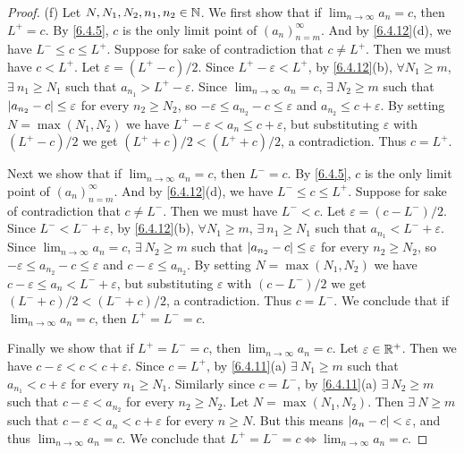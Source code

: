 \begin{proof}{(f)}
  Let \(N, N_1, N_2, n_1, n_2 \in \mathbb{N}\).
  We first show that if \(\lim_{n \to \infty} a_n = c\), then \(L^+ = c\).
  By \cref{6.4.5}, \(c\) is the only limit point of \((a_n)_{n = m}^\infty\).
  And by \cref{6.4.12}(d), we have \(L^- \leq c \leq L^+\).
  Suppose for sake of contradiction that \(c \neq L^+\).
  Then we must have \(c < L^+\).
  Let \(\varepsilon = (L^+ - c) / 2\).
  Since \(L^+ - \varepsilon < L^+\), by \cref{6.4.12}(b), \(\forall N_1 \geq m\), \(\exists\ n_1 \geq N_1\) such that \(a_{n_1} > L^+ - \varepsilon\).
  Since \(\lim_{n \to \infty} a_n = c\), \(\exists\ N_2 \geq m\) such that \(\left\lvert a_{n_2} - c\right\rvert \leq \varepsilon\) for every \(n_2 \geq N_2\), so \(-\varepsilon \leq a_{n_2} - c \leq \varepsilon\) and \(a_{n_2} \leq c + \varepsilon\).
  By setting \(N = \max(N_1, N_2)\) we have \(L^+ - \varepsilon < a_n \leq c + \varepsilon\), but substituting \(\varepsilon\) with \((L^+ - c) / 2\) we get \((L^+ + c) / 2 < (L^+ + c) / 2\), a contradiction.
  Thus \(c = L^+\).

  Next we show that if \(\lim_{n \to \infty} a_n = c\), then \(L^- = c\).
  By \cref{6.4.5}, \(c\) is the only limit point of \((a_n)_{n = m}^\infty\).
  And by \cref{6.4.12}(d), we have \(L^- \leq c \leq L^+\).
  Suppose for sake of contradiction that \(c \neq L^-\).
  Then we must have \(L^- < c\).
  Let \(\varepsilon = (c - L^-) / 2\).
  Since \(L^- < L^- + \varepsilon\), by \cref{6.4.12}(b), \(\forall N_1 \geq m\), \(\exists\ n_1 \geq N_1\) such that \(a_{n_1} < L^- + \varepsilon\).
  Since \(\lim_{n \to \infty} a_n = c\), \(\exists\ N_2 \geq m\) such that \(\left\lvert a_{n_2} - c\right\rvert \leq \varepsilon\) for every \(n_2 \geq N_2\), so \(-\varepsilon \leq a_{n_2} - c \leq \varepsilon\) and \(c - \varepsilon \leq a_{n_2}\).
  By setting \(N = \max(N_1, N_2)\) we have \(c - \varepsilon \leq a_n < L^- + \varepsilon\), but substituting \(\varepsilon\) with \((c - L^-) / 2\) we get \((L^- + c) / 2 < (L^- + c) / 2\), a contradiction.
  Thus \(c = L^-\).
  We conclude that if \(\lim_{n \to \infty} a_n = c\), then \(L^+ = L^- = c\).

  Finally we show that if \(L^+ = L^- = c\), then \(\lim_{n \to \infty} a_n = c\).
  Let \(\varepsilon \in \mathbb{R}^+\).
  Then we have \(c - \varepsilon < c < c + \varepsilon\).
  Since \(c = L^+\), by \cref{6.4.11}(a) \(\exists\ N_1 \geq m\) such that \(a_{n_1} < c + \varepsilon\) for every \(n_1 \geq N_1\).
  Similarly since \(c = L^-\), by \cref{6.4.11}(a) \(\exists\ N_2 \geq m\) such that \(c - \varepsilon < a_{n_2}\) for every \(n_2 \geq N_2\).
  Let \(N = \max(N_1, N_2)\).
  Then \(\exists\ N \geq m\) such that \(c - \varepsilon < a_n < c + \varepsilon\) for every \(n \geq N\).
  But this means \(\left\lvert a_n - c\right\rvert < \varepsilon\), and thus \(\lim_{n \to \infty} a_n = c\).
  We conclude that \(L^+ = L^- = c \iff \lim_{n \to \infty} a_n = c\).
\end{proof}

